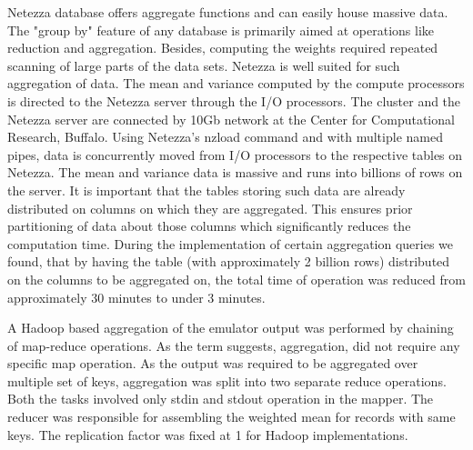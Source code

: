 \documentclass{acm_proc_article-sp}
\begin{document}
Netezza database offers aggregate functions and can easily house massive data. The "group by" feature of any database is primarily aimed at
operations like reduction and aggregation. Besides, computing the
 weights required repeated scanning of large parts of the data sets.
Netezza is well suited for such aggregation of data.  The mean and variance computed by the compute processors is directed
to the Netezza server through the I/O processors. The cluster and the Netezza server are connected by 10Gb network at the Center for
Computational Research, Buffalo. Using Netezza's nzload command and with multiple named pipes, data is concurrently moved from I/O processors
to the respective tables on Netezza. The mean and variance data is massive and runs into billions of rows on the server. 
It is important that
the tables storing such data are already distributed on columns on which they are aggregated. This ensures prior partitioning of data about
those columns which significantly reduces the computation time. During the implementation of certain aggregation queries we found, that by
having the table (with approximately 2 billion rows) distributed on the columns to be aggregated on, the total time of operation was reduced
from approximately 30 minutes to under 3 minutes.



A Hadoop based aggregation of the emulator output was performed by chaining of map-reduce operations. As the term suggests,
aggregation, did not require any specific map operation. As the output was required to be aggregated over 
multiple set of keys, aggregation was split into two separate reduce operations. 
Both the tasks involved only stdin and stdout operation in the mapper. The reducer was responsible for assembling the weighted mean 
for records with same keys. The replication factor was fixed at 1 for Hadoop implementations.
\end{document}
